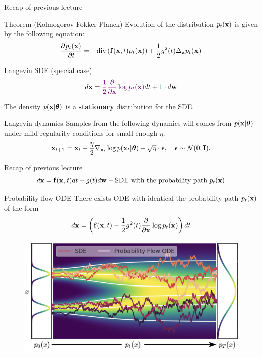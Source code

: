 \begin{frame}{Recap of previous lecture}
 	\begin{block}{Theorem (Kolmogorov-Fokker-Planck)}
 		Evolution of the distribution $p_t(\mathbf{x})$ is given by the following equation:
 		\vspace{-0.3cm}
 		\[
 			\frac{\partial p_t(\mathbf{x})}{\partial t} = - \text{div}\left(\mathbf{f}(\mathbf{x}, t) p_t(\mathbf{x})\right) + \frac{1}{2}g^2(t) \Delta_{\mathbf{x}}p_t(\mathbf{x})
 		\]
 		\vspace{-0.5cm}
 	\end{block}
 	\begin{block}{Langevin SDE (special case)}
 		\vspace{-0.3cm}
 		\[
 			d \mathbf{x} = {\color{violet}\frac{1}{2} \frac{\partial}{\partial \mathbf{x}} \log p_t(\mathbf{x})} d t + {\color{teal} 1 } \cdot d \mathbf{w}
 		\]
 		\vspace{-0.3cm}
 	\end{block}
 	The density $p(\mathbf{x} | \boldsymbol{\theta})$ is a \textbf{stationary} distribution for the SDE.
	\begin{block}{Langevin dynamics}
		Samples from the following dynamics will comes from $p(\mathbf{x} | \boldsymbol{\theta})$ under mild regularity conditions for small enough $\eta$.
		\vspace{-0.2cm}
		\[
			\mathbf{x}_{t + 1} = \mathbf{x}_t + \frac{\eta}{2} \nabla_{\mathbf{x}_t} \log p(\mathbf{x}_t | \boldsymbol{\theta}) + \sqrt{\eta} \cdot \boldsymbol{\epsilon}, \quad \boldsymbol{\epsilon} \sim \mathcal{N}(0, \mathbf{I}).
		\]
	\end{block}
\end{frame}
\begin{frame}{Recap of previous lecture}
	\vspace{-0.5cm}
	\[
		d\mathbf{x} = \mathbf{f}(\mathbf{x}, t) dt + g(t) d \mathbf{w} - \text{SDE with the probability path } p_t(\mathbf{x})
	\]
	\vspace{-0.5cm}
	\begin{block}{Probability flow ODE}
		There exists ODE with identical the probability path $p_t(\mathbf{x})$ of the form
		\[
			d\mathbf{x} = \left(\mathbf{f}(\mathbf{x}, t) -\frac{1}{2} g^2(t) \frac{\partial}{\partial \mathbf{x}} \log p_t(\mathbf{x}) \right) dt
		\]
		\vspace{-0.3cm}
	\end{block}
	\begin{figure}
		\includegraphics[width=0.75\linewidth]{figs/probability_flow}
	\end{figure}
\end{frame}
